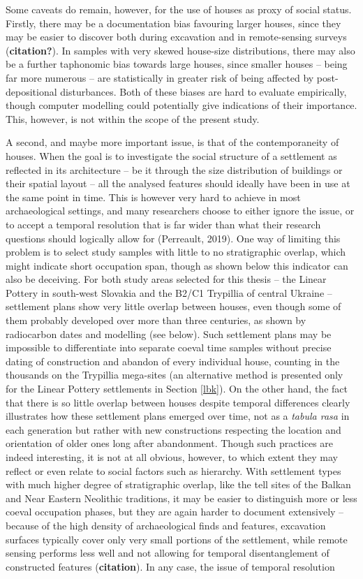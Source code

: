 \documentclass[
  12pt,
]{book}
\begin{document}
Some caveats do remain, however, for the use of houses as proxy of social status. Firstly, there may be a documentation bias favouring larger houses, since they may be easier to discover both during excavation and in remote-sensing surveys (\textbf{citation?}). In samples with very skewed house-size distributions, there may also be a further taphonomic bias towards large houses, since smaller houses -- being far more numerous -- are statistically in greater risk of being affected by post-depositional disturbances. Both of these biases are hard to evaluate empirically, though computer modelling could potentially give indications of their importance. This, however, is not within the scope of the present study.

A second, and maybe more important issue, is that of the contemporaneity of houses. When the goal is to investigate the social structure of a settlement as reflected in its architecture -- be it through the size distribution of buildings or their spatial layout -- all the analysed features should ideally have been in use at the same point in time. This is however very hard to achieve in most archaeological settings, and many researchers choose to either ignore the issue, or to accept a temporal resolution that is far wider than what their research questions should logically allow for (Perreault, 2019). One way of limiting this problem is to select study samples with little to no stratigraphic overlap, which might indicate short occupation span, though as shown below this indicator can also be deceiving. For both study areas selected for this thesis -- the Linear Pottery in south-west Slovakia and the B2/C1 Trypillia of central Ukraine -- settlement plans show very little overlap between houses, even though some of them probably developed over more than three centuries, as shown by radiocarbon dates and modelling (see below). Such settlement plans may be impossible to differentiate into separate coeval time samples without precise dating of construction and abandon of every individual house, counting in the thousands on the Trypillia mega-sites (an alternative method is presented only for the Linear Pottery settlements in Section \ref{lbk}). On the other hand, the fact that there is so little overlap between houses despite temporal differences clearly illustrates how these settlement plans emerged over time, not as a \emph{tabula rasa} in each generation but rather with new constructions respecting the location and orientation of older ones long after abandonment. Though such practices are indeed interesting, it is not at all obvious, however, to which extent they may reflect or even relate to social factors such as hierarchy. With settlement types with much higher degree of stratigraphic overlap, like the tell sites of the Balkan and Near Eastern Neolithic traditions, it may be easier to distinguish more or less coeval occupation phases, but they are again harder to document extensively -- because of the high density of archaeological finds and features, excavation surfaces typically cover only very small portions of the settlement, while remote sensing performs less well and not allowing for temporal disentanglement of constructed features (\textbf{citation}). In any case, the issue of temporal resolution 
\end{document}
